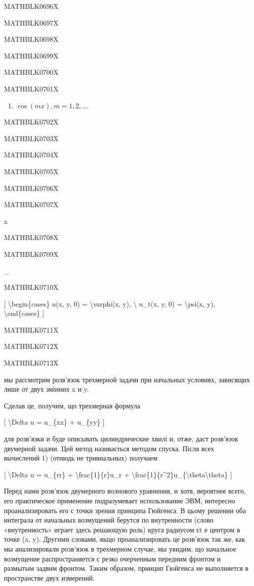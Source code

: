 \documentclass[
]{article}
\providecommand{\tightlist}{%
  \setlength{\itemsep}{0pt}\setlength{\parskip}{0pt}}
\begin{document}
MATHBLK0696X

MATHBLK0697X

MATHBLK0698X

MATHBLK0699X

MATHBLK0700X

MATHBLK0701X

\begin{enumerate}
\def\labelenumi{\arabic{enumi}.}
\setcounter{enumi}{4}
\tightlist
\item
  \(\cos(mx), m=1, 2, \dots\)
\end{enumerate}

MATHBLK0702X

MATHBLK0703X

MATHBLK0704X

MATHBLK0705X

MATHBLK0706X

MATHBLK0707X

x

MATHBLK0708X

MATHBLK0709X

\_ \textbar{}

MATHBLK0710X

{[} \textbackslash begin\{cases\} u(x, y, 0) = \textbackslash varphi(x,
y), \textbackslash{} u\_t(x, y, 0) = \textbackslash psi(x, y),
\textbackslash end\{cases\} {]}

MATHBLK0711X

MATHBLK0712X

MATHBLK0713X

мы рассмотрим розв'язок трехмерной задачи при начальных условиях,
зависящих лише от двух змінних x и y.

Сделав це, получим, що трехмерная формула

{[} \textbackslash Delta u = u\_\{xx\} + u\_\{yy\} {]}

для розв'язки и буде описывать цилиндрические хвилі и, отже, даст
розв'язок двумерной задачи. Цей метод називається методом спуска. Після
всех вычислений 1) (отнюдь не тривиальных) получаем

{[} \textbackslash Delta u = u\_\{rr\} +
\textbackslash frac\{1\}\{r\}u\_r +
\textbackslash frac\{1\}\{r\^{}2\}u\_\{\textbackslash theta\textbackslash theta\}
{]}

Перед нами розв'язок двумерного волнового уравнения, и хотя, вероятнее
всего, его практическое применение подразумевает использование ЭВМ,
интересно проанализировать его с точки зрения принципа Гюйгенса. В цьому
решении оба интеграла от начальных возмущений берутся по внутренности
(слово «внутренность» играет здесь решающую роль) круга радиусом сt е
центром в точке (x, y). Другими словами, якщо проанализировать це
розв'язок так же, как мы анализировали розв'язок в трехмерном случае, мы
увидим, що начальное возмущение распространяется с резко очерченным
передним фронтом и размытым задвим фронтом. Таким образом, принцип
Гюйгенса не выполняется в пространстве двух измерений.
\end{document}
